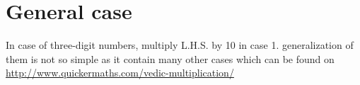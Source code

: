 \documentclass{article}
\begin{document}
\section{General case}
In case of three-digit numbers, multiply L.H.S. by 10 in  case 1. generalization of them is not so simple as it contain many other cases which can be found on \url{http://www.quickermaths.com/vedic-multiplication/}



\printbibliography
%
\newpage

\end{document}
